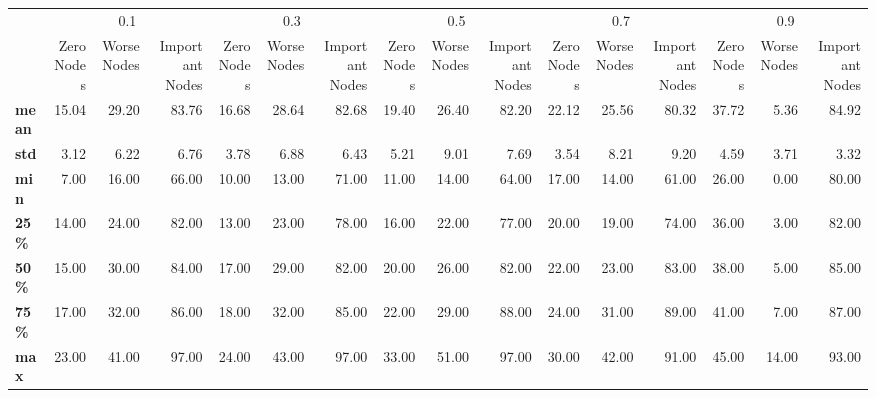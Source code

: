 \begin{tabular}{lrrrrrrrrrrrrrrr}
\toprule
{} & \multicolumn{3}{c}{0.1} & \multicolumn{3}{c}{0.3} & \multicolumn{3}{c}{0.5} & \multicolumn{3}{c}{0.7} & \multicolumn{3}{c}{0.9} \\
{} & Zero Nodes & Worse Nodes & Important Nodes & Zero Nodes & Worse Nodes & Important Nodes & Zero Nodes & Worse Nodes & Important Nodes & Zero Nodes & Worse Nodes & Important Nodes & Zero Nodes & Worse Nodes & Important Nodes \\
\midrule
\textbf{mean} &      15.04 &       29.20 &           83.76 &      16.68 &       28.64 &           82.68 &      19.40 &       26.40 &           82.20 &      22.12 &       25.56 &           80.32 &      37.72 &        5.36 &           84.92 \\
\textbf{std } &       3.12 &        6.22 &            6.76 &       3.78 &        6.88 &            6.43 &       5.21 &        9.01 &            7.69 &       3.54 &        8.21 &            9.20 &       4.59 &        3.71 &            3.32 \\
\textbf{min } &       7.00 &       16.00 &           66.00 &      10.00 &       13.00 &           71.00 &      11.00 &       14.00 &           64.00 &      17.00 &       14.00 &           61.00 &      26.00 &        0.00 &           80.00 \\
\textbf{25\% } &      14.00 &       24.00 &           82.00 &      13.00 &       23.00 &           78.00 &      16.00 &       22.00 &           77.00 &      20.00 &       19.00 &           74.00 &      36.00 &        3.00 &           82.00 \\
\textbf{50\% } &      15.00 &       30.00 &           84.00 &      17.00 &       29.00 &           82.00 &      20.00 &       26.00 &           82.00 &      22.00 &       23.00 &           83.00 &      38.00 &        5.00 &           85.00 \\
\textbf{75\% } &      17.00 &       32.00 &           86.00 &      18.00 &       32.00 &           85.00 &      22.00 &       29.00 &           88.00 &      24.00 &       31.00 &           89.00 &      41.00 &        7.00 &           87.00 \\
\textbf{max } &      23.00 &       41.00 &           97.00 &      24.00 &       43.00 &           97.00 &      33.00 &       51.00 &           97.00 &      30.00 &       42.00 &           91.00 &      45.00 &       14.00 &           93.00 \\
\bottomrule
\end{tabular}
